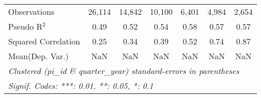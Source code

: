 \begin{tabular}{lcccccc}
   Observations                                               & 26,114  & 14,842         & 10,100  & 6,401   & 4,984   & 2,654\\  
   Pseudo R$^2$                                               & 0.49    & 0.52           & 0.54    & 0.58    & 0.57    & 0.57\\  
   Squared Correlation                                        & 0.25    & 0.34           & 0.39    & 0.52    & 0.74    & 0.87\\  
Mean(Dep. Var.) & NaN & NaN & NaN & NaN & NaN & NaN \\
   \midrule \midrule
   \multicolumn{7}{l}{\emph{Clustered (pi\_id \& quarter\_year) standard-errors in parentheses}}\\
   \multicolumn{7}{l}{\emph{Signif. Codes: ***: 0.01, **: 0.05, *: 0.1}}\\
\end{tabular}
\par\endgroup
